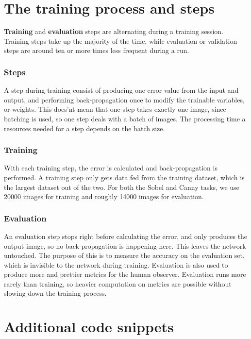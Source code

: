 \documentclass[12pt]{report}
\begin{document}
\section{The training process and steps}
\textbf{Training} and \textbf{evaluation} steps are alternating during a training session. Training steps take up the majority of the time, while evaluation or validation steps are around ten or more times less frequent during a run.
\subsubsection{Steps}
A step during training consist of producing one error value from the input and output, and performing back-propagation once to modify the trainable variables, or weights. This does'nt mean that one step takes exactly one image, since batching is used, so one step deals with a batch of images. The processing time a resources needed for a step depends on the batch size.
\subsubsection{Training}
With each training step, the error is calculated and back-propagation is performed. A training step only gets data fed from the training dataset, which is the largest dataset out of the two. For both the Sobel and Canny tasks, we use 20000 images for training and roughly 14000 images for evaluation.
\subsubsection{Evaluation}
An evaluation step stops right before calculating the error, and only produces the output image, so no back-propagation is happening here. This leaves the network untouched. The purpose of this is to measure the accuracy on the evaluation set, which is invisible to the network during training. Evaluation is also used to produce more and prettier metrics for the human observer. Evaluation runs more rarely than training, so heavier computation on metrics are possible without slowing down the training process.
\section{Additional code snippets}
\end{document}
